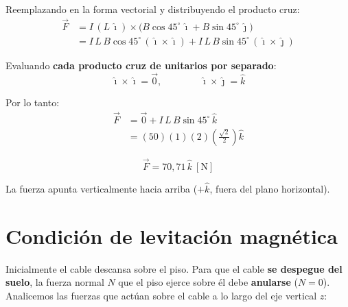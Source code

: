\documentclass[12pt,letterpaper]{article}
\begin{document}
\bigskip

\noindent Reemplazando en la forma vectorial y distribuyendo el producto cruz:
\begin{align*}
    \vec{F} &= I\,(L\,\hat{\imath})\times\bigl(B\cos45^\circ\,\hat{\imath} + B\sin45^\circ\,\hat{\jmath}\bigr) \\[4pt]
            &= I\,L\,B\cos45^\circ\,(\hat{\imath}\times\hat{\imath})
             + I\,L\,B\sin45^\circ\,(\hat{\imath}\times\hat{\jmath})
\end{align*}

\noindent Evaluando \textbf{cada producto cruz de unitarios por separado}:
\[
    \hat{\imath}\times\hat{\imath} = \vec{0},
    \qquad\qquad
    \hat{\imath}\times\hat{\jmath} = \hat{k}
\]

\noindent Por lo tanto:
\begin{align*}
    \vec{F} &= \vec{0} + I\,L\,B\sin45^\circ\,\hat{k} \\[4pt]
            &= (50)(1)(2)\left(\tfrac{\sqrt{2}}{2}\right)\hat{k}
\end{align*}

\[
    \boxed{\vec{F} = 70{,}71\,\hat{k}\ [\text{N}]}
\]

\noindent La fuerza apunta verticalmente hacia arriba ($+\hat{k}$, fuera del plano horizontal).

\newpage

\section*{Condici\'on de levitaci\'on magn\'etica}

\noindent Inicialmente el cable descansa sobre el piso. Para que el cable \textbf{se despegue del
suelo}, la fuerza normal $N$ que el piso ejerce sobre \'el debe \textbf{anularse} ($N = 0$).
Analicemos las fuerzas que act\'uan sobre el cable a lo largo del eje vertical $z$:

\medskip
\end{document}
